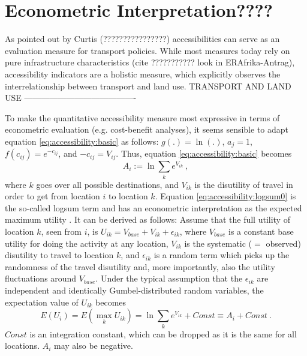 \section{Econometric Interpretation????}

As pointed out by Curtis (????????????????) accessibilities can serve as an evaluation measure for transport 
policies. While most measures today rely on pure infrastructure characteristics (cite ??????????? look in ERAfrika-Antrag), 
accessibility indicators are a holistic measure, which explicitly observes the interrelationship between transport and land use.
TRANSPORT AND LAND USE ----------------------------------------


To make the quantitative accessibility measure most expressive in terms of econometric evaluation (e.g. cost-benefit 
analyses), it seems sensible to adapt equation \ref{eq:accessibility:basic} as 
follows: $g(.) = \ln(.)$, $a_j = 1$, $f(c_{ij}) = e^{-c_{ij}}$, and $-c_{ij} = V_{ij}$. Thus, 
equation \ref{eq:accessibility:basic} becomes
\begin{equation}
	A_i := \ln \sum_k e^{V_{ik}} \ ,
	\label{eq:accessibility:logsum0}
\end{equation}
where $k$ goes over all possible destinations, and $V_{ik}$ is the
disutility of travel in order to get from location $i$ to location
$k$. Equation \ref{eq:accessibility:logsum0} is the so-called logsum term and has an econometric interpretation 
as the expected maximum utility \citep[e.g.][]{Ben-AkivaBook}. It can be derived as follows: Assume that the full 
utility of location $k$, seen from $i$, is $U_{ik} = V_{base} + V_{ik} + \epsilon_{ik}$, where $V_{base}$ is a constant 
base utility for doing the activity at any location, $V_{ik}$ is the systematic ($=$ observed) disutility to travel to 
location $k$, and $\epsilon_{ik}$ is a random term which picks up the randomness of the travel disutility and, more 
importantly, also the utility fluctuations around $V_{base}$.  Under the typical assumption that the $\epsilon_{ik}$ 
are independent and identically Gumbel-distributed random variables, the expectation value of $U_{ik}$ becomes
\begin{equation}
	E(U_i) = E(\max_k U_{ik}) = \ln \sum_k e^{V_{ik}} + Const \equiv A_i + Const \ .
\end{equation}
$Const$ is an integration constant, which can be dropped as it is the same for all locations. $A_i$ may also be negative.

